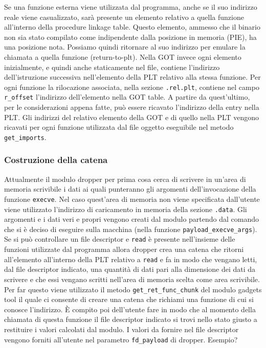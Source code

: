 Se una funzione esterna viene utilizzata dal programma, anche se il
suo indirizzo reale viene casualizzato, sarà presente un elemento
relativo a quella funzione all'interno della procedure linkage
table. Questo elemento, ammesso che il binario non sia stato compilato
come indipendente dalla posizione in memoria (PIE), ha una posizione
nota. Possiamo quindi ritornare al suo indirizzo per emulare la
chiamata a quella funzione (return-to-plt). Nella GOT invece ogni
elemento inizialmente, e quindi anche staticamente nel file, contiene
l'indirizzo dell'istruzione successiva nell'elemento della PLT
relativo alla stessa funzione. Per ogni funzione la rilocazione
associata, nella sezione \lstinline{.rel.plt}, contiene nel campo
\lstinline{r_offset} l'indirizzo dell'elemento nella GOT table. A
partire da quest'ultimo, per le considerazioni appena fatte, può
essere ricavato l'indirizzo della entry nella PLT. Gli indirizzi del
relativo elemento della GOT e di quello nella PLT vengono ricavati per
ogni funzione utilizzata dal file oggetto eseguibile nel metodo
\lstinline{get_imports}.

\subsubsection{Costruzione della catena}

Attualmente il modulo dropper per prima cosa cerca di scrivere in
un'area di memoria scrivibile i dati ai quali punteranno gli argomenti
dell'invocazione della funzione \lstinline{execve}. Nel caso
quest'area di memoria non viene specificata dall'utente viene
utilizzato l'indirizzo di caricamento in memoria della sezione
\lstinline{.data}. Gli argomenti e i dati veri e propri vengono creati
dal modulo partendo dal comando che si è deciso di eseguire sulla
macchina (nella funzione \lstinline{payload_execve_args}). Se si può
controllare un file descriptor e \lstinline{read} è presente
nell'insieme delle funzioni utilizzate dal programma allora dropper
crea una catena che ritorni all'elemento all'interno della PLT
relativo a \lstinline{read} e fa in modo che vengano letti, dal file
descriptor indicato, una quantità di dati pari alla dimensione dei
dati da scrivere e che essi vengano scritti nell'area di memoria
scelta come area scrivibile. Per far questo viene utilizzato il metodo
\lstinline{get_ret_func_chunk} del modulo gadgets tool il quale ci
consente di creare una catena che richiami una funzione di cui si
conosce l'indirizzo. È compito poi dell'utente fare in modo che al
momento della chiamata di questa funzione il file descriptor indicato
si trovi nello stato giusto a restituire i valori calcolati dal
modulo. I valori da fornire nel file descriptor vengono forniti
all'utente nel parametro \lstinline{fd_payload} di dropper.
Esempio?

